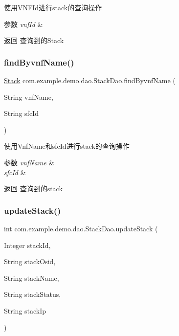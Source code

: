 使用\+V\+N\+F\+Id进行stack的查询操作 
\begin{DoxyParams}{参数}
{\em vnf\+Id} & \\
\hline
\end{DoxyParams}
\begin{DoxyReturn}{返回}
查询到的\+Stack 
\end{DoxyReturn}
\mbox{\label{interfacecom_1_1example_1_1demo_1_1dao_1_1_stack_dao_a33cc52a138be1713c465af88125ec410}} 
\subsubsection{\texorpdfstring{find\+Byvnf\+Name()}{findByvnfName()}}
{\footnotesize\ttfamily \mbox{\hyperlink{classcom_1_1example_1_1demo_1_1modular_1_1_stack}{Stack}} com.\+example.\+demo.\+dao.\+Stack\+Dao.\+find\+Byvnf\+Name (\begin{DoxyParamCaption}\item[{String}]{vnf\+Name,  }\item[{String}]{sfc\+Id }\end{DoxyParamCaption})}

使用\+Vnf\+Name和sfc\+Id进行stack的查询操作 
\begin{DoxyParams}{参数}
{\em vnf\+Name} & \\
\hline
{\em sfc\+Id} & \\
\hline
\end{DoxyParams}
\begin{DoxyReturn}{返回}
查询到的stack 
\end{DoxyReturn}
\mbox{\label{interfacecom_1_1example_1_1demo_1_1dao_1_1_stack_dao_afe823d139ca863dcdf952bb7b4afa2d2}} 
\subsubsection{\texorpdfstring{update\+Stack()}{updateStack()}}
{\footnotesize\ttfamily int com.\+example.\+demo.\+dao.\+Stack\+Dao.\+update\+Stack (\begin{DoxyParamCaption}\item[{Integer}]{stack\+Id,  }\item[{String}]{stack\+Osid,  }\item[{String}]{stack\+Name,  }\item[{String}]{stack\+Status,  }\item[{String}]{stack\+Ip }\end{DoxyParamCaption})}

